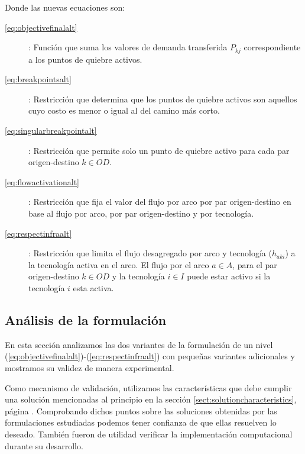 \documentclass{article}
\begin{document}
  Donde las nuevas ecuaciones son:

  \begin{description}
    \item[\ref{eq:objectivefinalalt}]: Función que suma los valores de demanda transferida $P_{kj}$ correspondiente a los puntos de quiebre activos.
    \item[\ref{eq:breakpointsalt}]: Restricción que determina que los puntos de quiebre activos son aquellos cuyo costo es menor o igual al del camino más corto.
    \item[\ref{eq:singularbreakpointalt}]: Restricción que permite solo un punto de quiebre activo para cada par origen-destino $k \in OD$.
    \item[\ref{eq:flowactivationalt}]: Restricción que fija el valor del flujo por arco por par origen-destino en base al flujo por arco, por par origen-destino y por tecnología.
    \item[\ref{eq:respectinfraalt}]: Restricción que limita el flujo desagregado por arco y tecnología ($h_{aki}$) a la tecnología activa en el arco. El flujo por el arco $a \in A$, para el par origen-destino $k \in OD$ y la tecnología $i \in I$ puede estar activo si la tecnología $i$ esta activa.
  \end{description}

  \subsection{Análisis de la formulación}

  En esta sección analizamos las dos variantes de la formulación de un nivel (\ref{eq:objectivefinalalt})-(\ref{eq:respectinfraalt}) con pequeñas variantes adicionales y mostramos su validez de manera experimental.

  Como mecanismo de validación, utilizamos las características que debe cumplir una solución mencionadas al principio en la sección \ref{sect:solutioncharacteristics}, página \pageref{sect:solutioncharacteristics}. Comprobando dichos puntos sobre las soluciones obtenidas por las formulaciones estudiadas podemos tener confianza de que ellas resuelven lo deseado. También fueron de utilidad verificar la implementación computacional durante su desarrollo.

\end{document}
